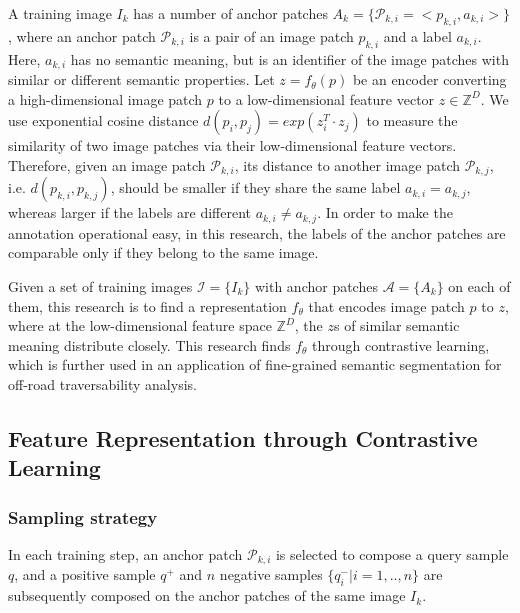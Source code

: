 \documentclass[letterpaper, 10 pt, conference]{ieeeconf}  %
\begin{document}
A training image $I_k$ has a number of anchor patches $A_k=\{\mathcal{P}_{k,i}=<p_{k,i},a_{k,i}>\}$, where an anchor patch $\mathcal{P}_{k,i}$ is a pair of an image patch $p_{k,i}$ and a label $a_{k,i}$. Here, $a_{k,i}$ has no semantic meaning, but is an identifier of the image patches with similar or different semantic properties.
Let $z=f_{\theta}(p)$ be an encoder converting a high-dimensional image patch $p$ to a low-dimensional feature vector $z\in \mathbb{Z}^D$. 
We use exponential cosine distance $d(p_i,p_j)=exp(z_i^T \cdot z_j)$ to measure the similarity of two image patches via their low-dimensional feature vectors.
Therefore, given an image patch $\mathcal{P}_{k,i}$, its distance to another image patch $\mathcal{P}_{k,j}$, i.e. $d(p_{k,i},p_{k,j})$, should be smaller if they share the same label $a_{k,i}=a_{k,j}$, whereas larger if the labels are different $a_{k,i} \neq a_{k,j}$.
In order to make the annotation operational easy, in this research, the labels of the anchor patches are comparable only if they belong to the same image.

Given a set of training images $\mathcal{I}=\{I_k\}$ with anchor patches $\mathcal{A}=\{A_k\}$ on each of them, this research is to find a representation $f_{\theta}$ that encodes image patch $p$ to $z$, where at the low-dimensional feature space $\mathbb{Z}^D$, the $z$s of similar semantic meaning distribute closely. 
This research finds $f_{\theta}$ through contrastive learning, which is further used in an application of fine-grained semantic segmentation for off-road traversability analysis.
\subsection{Feature Representation through Contrastive Learning}

\subsubsection {Sampling strategy}
In each training step, an anchor patch $\mathcal{P}_{k,i}$ is selected to compose a query sample $q$, and a positive sample $q^+$ and $n$ negative samples $\{q^-_i|i=1,..,n\}$ are subsequently composed on the anchor patches of the same image $I_k$.
\end{document}
